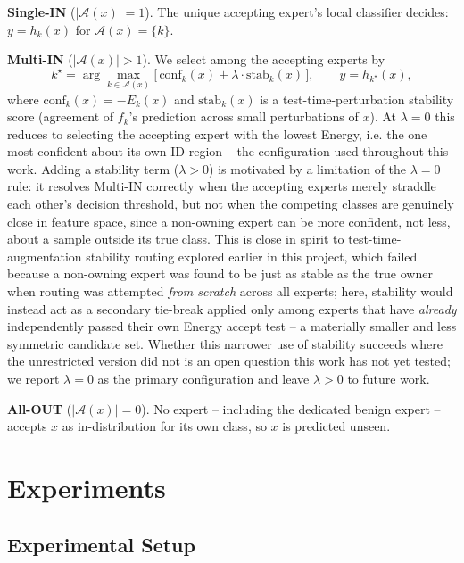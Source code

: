 \documentclass[sigconf]{acmart}
\begin{document}
\textbf{Single-IN} ($|\mathcal{A}(x)| = 1$). The unique accepting expert's local classifier decides: $y = h_k(x)$ for $\mathcal{A}(x) = \{k\}$.

\textbf{Multi-IN} ($|\mathcal{A}(x)| > 1$). We select among the accepting experts by
\begin{equation}
k^\star = \arg\max_{k \in \mathcal{A}(x)} \big[\, \mathrm{conf}_k(x) + \lambda \cdot \mathrm{stab}_k(x) \,\big], \qquad y = h_{k^\star}(x),
\end{equation}
where $\mathrm{conf}_k(x) = -E_k(x)$ and $\mathrm{stab}_k(x)$ is a test-time-perturbation stability score (agreement of $f_k$'s prediction across small perturbations of $x$). At $\lambda = 0$ this reduces to selecting the accepting expert with the lowest Energy, i.e. the one most confident about its own ID region -- the configuration used throughout this work. Adding a stability term ($\lambda > 0$) is motivated by a limitation of the $\lambda = 0$ rule: it resolves Multi-IN correctly when the accepting experts merely straddle each other's decision threshold, but not when the competing classes are genuinely close in feature space, since a non-owning expert can be more confident, not less, about a sample outside its true class. This is close in spirit to test-time-augmentation stability routing explored earlier in this project, which failed because a non-owning expert was found to be just as stable as the true owner when routing was attempted \emph{from scratch} across all experts; here, stability would instead act as a secondary tie-break applied only among experts that have \emph{already} independently passed their own Energy accept test -- a materially smaller and less symmetric candidate set. Whether this narrower use of stability succeeds where the unrestricted version did not is an open question this work has not yet tested; we report $\lambda = 0$ as the primary configuration and leave $\lambda > 0$ to future work.

\textbf{All-OUT} ($|\mathcal{A}(x)| = 0$). No expert -- including the dedicated benign expert -- accepts $x$ as in-distribution for its own class, so $x$ is predicted unseen.


\section{Experiments}
\subsection{Experimental Setup}
\end{document}
